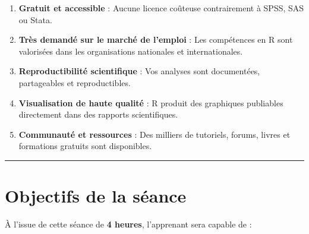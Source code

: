 \documentclass[
  french,
  11pt,
  a4paper,
]{article}
\providecommand{\tightlist}{%
  \setlength{\itemsep}{0pt}\setlength{\parskip}{0pt}}
\begin{document}
\begin{tcolorbox}[enhanced jigsaw, arc=.35mm, bottomrule=.15mm, bottomtitle=1mm, breakable, colback=white, colbacktitle=quarto-callout-tip-color!10!white, colframe=quarto-callout-tip-color-frame, coltitle=black, left=2mm, leftrule=.75mm, opacityback=0, opacitybacktitle=0.6, rightrule=.15mm, title=\textcolor{quarto-callout-tip-color}{\faLightbulb}\hspace{0.5em}{Les 5 bonnes raisons d'apprendre R}, titlerule=0mm, toprule=.15mm, toptitle=1mm]

\begin{enumerate}
\def\labelenumi{\arabic{enumi}.}
\tightlist
\item
  \textbf{Gratuit et accessible} : Aucune licence coûteuse contrairement
  à SPSS, SAS ou Stata.
\item
  \textbf{Très demandé sur le marché de l'emploi} : Les compétences en R
  sont valorisées dans les organisations nationales et internationales.
\item
  \textbf{Reproductibilité scientifique} : Vos analyses sont
  documentées, partageables et reproductibles.
\item
  \textbf{Visualisation de haute qualité} : R produit des graphiques
  publiables directement dans des rapports scientifiques.
\item
  \textbf{Communauté et ressources} : Des milliers de tutoriels, forums,
  livres et formations gratuits sont disponibles.
\end{enumerate}

\end{tcolorbox}

\begin{center}\rule{0.5\linewidth}{0.5pt}\end{center}

\section*{Objectifs de la séance}\label{objectifs-de-la-suxe9ance}

À l'issue de cette séance de \textbf{4 heures}, l'apprenant sera capable
de :
\end{document}
